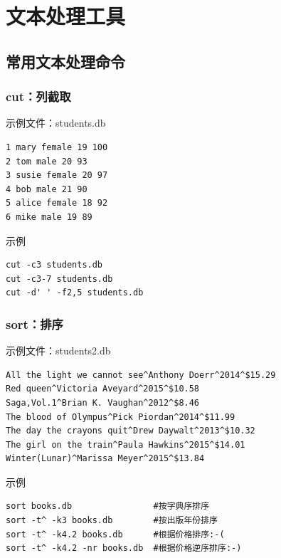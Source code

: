 \documentclass[xcolor=svgnames,presentation]{beamer}
\begin{document}
\section{文本处理工具}
\label{sec-3}
\subsection{常用文本处理命令}
\label{sec-3-1}
\begin{frame}[fragile]
\frametitle{cut：列截取}
\label{sec-3-1-1}
\begin{exampleblock}{示例文件：students.db}
\label{sec-3-1-1-1}


\begin{verbatim}
1 mary female 19 100
2 tom male 20 93
3 susie female 20 97
4 bob male 21 90
5 alice female 18 92
6 mike male 19 89
\end{verbatim}
\end{exampleblock}
\begin{block}{示例}
\label{sec-3-1-1-2}


\begin{verbatim}
cut -c3 students.db
cut -c3-7 students.db
cut -d' ' -f2,5 students.db
\end{verbatim}
\end{block}
\end{frame}
\begin{frame}[fragile]
\frametitle{sort：排序}
\label{sec-3-1-2}
\begin{exampleblock}{示例文件：students2.db}
\label{sec-3-1-2-1}


\begin{verbatim}
All the light we cannot see^Anthony Doerr^2014^$15.29
Red queen^Victoria Aveyard^2015^$10.58
Saga,Vol.1^Brian K. Vaughan^2012^$8.46
The blood of Olympus^Pick Piordan^2014^$11.99
The day the crayons quit^Drew Daywalt^2013^$10.32
The girl on the train^Paula Hawkins^2015^$14.01
Winter(Lunar)^Marissa Meyer^2015^$13.84
\end{verbatim}
\end{exampleblock}
\begin{block}{示例}
\label{sec-3-1-2-2}


\begin{verbatim}
sort books.db                #按字典序排序
sort -t^ -k3 books.db        #按出版年份排序
sort -t^ -k4.2 books.db      #根据价格排序:-(
sort -t^ -k4.2 -nr books.db  #根据价格逆序排序:-)
\end{verbatim}
\end{block}
\end{frame}
\end{document}
